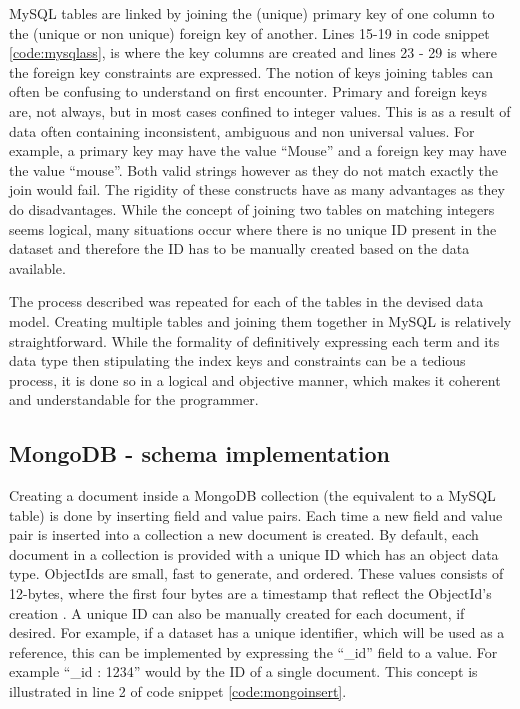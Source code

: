 MySQL tables are linked by joining the (unique) primary key of one column to the (unique or non unique) foreign key of another. Lines 15-19 in code snippet \ref{code:mysqlass}, is where the key columns are created and lines 23 - 29 is where the foreign key constraints are expressed. The notion of keys joining tables can often be confusing to understand on first encounter. Primary and foreign keys are, not always, but in most cases confined to integer values. This is as a result of data often containing inconsistent, ambiguous and non universal values. For example, a primary key may have the value ``Mouse'' and a foreign key may have the value ``mouse''. Both valid strings however as they do not match exactly the join would fail. The rigidity of these constructs have as many advantages as they do disadvantages. While the concept of joining two tables on matching integers seems logical, many situations occur where there is no unique ID present in the dataset and therefore the ID has to be manually created based on the data available.

The process described was repeated for each of the tables in the devised data model. Creating multiple tables and joining them together in MySQL is relatively straightforward. While the formality of definitively expressing each term and its data type then stipulating the index keys and constraints can be a tedious process, it is done so in a logical and objective manner, which makes it coherent and understandable for the programmer.

\subsection{MongoDB - schema implementation}\label{mongocreate}
Creating a document inside a MongoDB collection (the equivalent to a MySQL table) is done by inserting field and value pairs. Each time a new field and value pair is inserted into a collection a new document is created. By default, each document in a collection is provided with a unique ID which has an object data type. ObjectIds are small, fast to generate, and ordered. These values consists of 12-bytes, where the first four bytes are a timestamp that reflect the ObjectId's creation \cite{md}. A unique ID can also be manually created for each document, if desired. For example, if a dataset has a unique identifier, which will be used as a reference, this can be implemented by expressing the ``\_id'' field to a value. For example ``\_id : 1234'' would by the ID of a single document. This concept is illustrated in line 2 of code snippet \ref{code:mongoinsert}.

